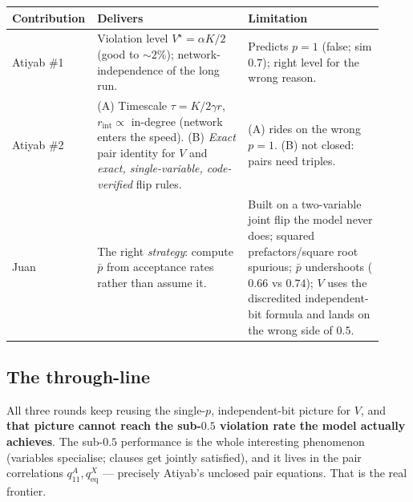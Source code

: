 \documentclass[11pt]{article}
\begin{document}
\begin{center}
\renewcommand{\arraystretch}{1.3}
\begin{tabular}{p{0.16\linewidth} p{0.40\linewidth} p{0.36\linewidth}}
\toprule
\textbf{Contribution} & \textbf{Delivers} & \textbf{Limitation}\\
\midrule
Atiyab \#1 &
Violation level $V^\star=\alpha K/2$ (good to $\sim\!2\%$); network-independence of the long run. &
Predicts $p=1$ (false; sim $0.7$); right level for the wrong reason.\\
\midrule
Atiyab \#2 &
(A) Timescale $\tau=K/2\gamma r$, $r_{\text{int}}\propto$ in-degree (network enters the speed).
(B) \emph{Exact} pair identity for $V$ and \emph{exact, single-variable, code-verified} flip rules. &
(A) rides on the wrong $p=1$. (B) not closed: pairs need triples.\\
\midrule
Juan &
The right \emph{strategy}: compute $\bar p$ from acceptance rates rather than assume it. &
Built on a two-variable joint flip the model never does; squared prefactors/square root spurious;
$\bar p$ undershoots ($0.66$ vs $0.74$); $V$ uses the discredited independent-bit formula and lands
on the wrong side of $0.5$.\\
\bottomrule
\end{tabular}
\end{center}

\subsection{The through-line}
All three rounds keep reusing the single-$p$, independent-bit picture for $V$, and \textbf{that
picture cannot reach the sub-$0.5$ violation rate the model actually achieves}. The sub-$0.5$
performance is the whole interesting phenomenon (variables specialise; clauses get jointly
satisfied), and it lives in the pair correlations $q^A_{11},q^X_{\text{eq}}$ --- precisely
Atiyab's unclosed pair equations. That is the real frontier.
\end{document}
